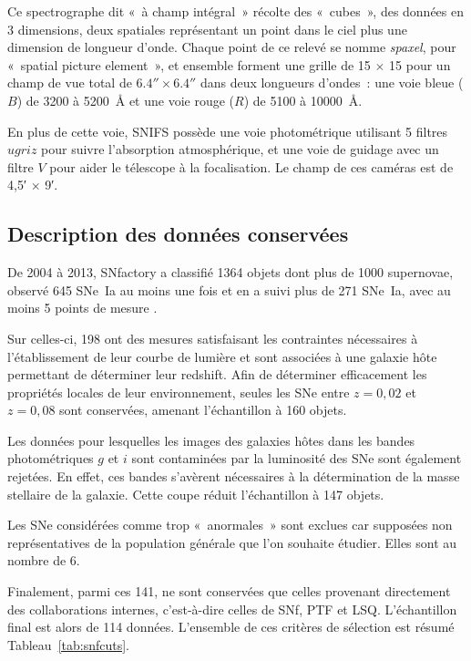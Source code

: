 \documentclass[../main/main.tex]{subfiles}
\begin{document}
Ce spectrographe dit «~à champ intégral~» récolte des «~cubes~», des données en
3 dimensions, deux spatiales représentant un point dans le ciel plus une
dimension de longueur d'onde. Chaque point de ce relevé se nomme
\textit{spaxel}, pour «~spatial picture element~», et ensemble forment une
grille de 15 $\times$ 15 pour un champ de vue total de
$\ang{;;6,4}\times\ang{;;6,4}$ dans deux longueurs d'ondes~: une voie bleue
($B$) de 3200 à \SI{5200}{\angstrom} et une voie rouge ($R$) de 5100 à
\SI{10000}{\angstrom}.

En plus de cette voie, SNIFS possède une voie photométrique utilisant 5 filtres
$ugriz$ pour suivre l'absorption atmosphérique, et une voie de guidage avec un
filtre $V$ pour aider le télescope à la focalisation. Le champ de ces caméras
est de \ang{;4,5;} $\times$ \ang{;9;}.

\subsection{Description des données conservées}\label{ssec:snfdata}

De 2004 à 2013, SNfactory a classifié 1364 objets dont plus de 1000 supernovae,
observé 645 SNe~Ia au moins une fois et en a suivi plus de 271 SNe~Ia, avec au
moins 5 points de mesure \citep{copin2013}.

Sur celles-ci, 198 ont des mesures satisfaisant les contraintes nécessaires à
l'établissement de leur courbe de lumière et sont associées à une galaxie hôte
permettant de déterminer leur redshift. Afin de déterminer efficacement les
propriétés locales de leur environnement, seules les SNe entre $z = 0,02$ et $z
= 0,08$ sont conservées, amenant l'échantillon à 160 objets.

Les données pour lesquelles les images des galaxies hôtes dans les bandes
photométriques $g$ et $i$ sont contaminées par la luminosité des SNe sont
également rejetées. En effet, ces bandes s'avèrent nécessaires à la
détermination de la masse stellaire de la galaxie. Cette coupe réduit
l'échantillon à 147 objets.

Les SNe considérées comme trop «~anormales~» sont exclues car supposées non
représentatives de la population générale que l'on souhaite étudier. Elles sont
au nombre de 6.

Finalement, parmi ces 141, ne sont conservées que celles provenant directement
des collaborations internes, c'est-à-dire celles de SNf, PTF et LSQ.
L'échantillon final est alors de 114 données. L'ensemble de ces critères de
sélection est résumé Tableau~\ref{tab:snfcuts}.
\end{document}
